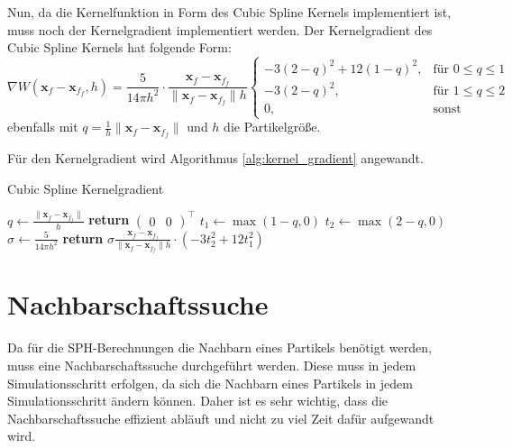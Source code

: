 \documentclass[11pt,
a4paper,
parskip=half, %
BCOR=10mm, %
english,
ngerman]{scrreprt}
\begin{document}
Nun, da die Kernelfunktion in Form des Cubic Spline Kernels implementiert ist, muss noch der Kernelgradient implementiert werden.
Der Kernelgradient des Cubic Spline Kernels hat folgende Form:
\begin{equation}
    \nabla W(\textbf{x}_f - \textbf{x}_{f_f}, h) = \frac{5}{14\pi h^2} \cdot \frac{\textbf{x}_f - \textbf{x}_{f_f}}{\|\textbf{x}_f - \textbf{x}_{f_f}\| h} \begin{cases}
        -3(2-q)^2 + 12(1-q)^2, &\text{für } 0 \leq q \leq 1\\
        -3(2-q)^2, &\text{für } 1 \leq q \leq 2\\
        0, &\text{sonst}
    \end{cases}
\end{equation}
ebenfalls mit $q = \frac{1}{h}\|\textbf{x}_f - \textbf{x}_{f_f}\|$ und $h$ die Partikelgröße.

Für den Kernelgradient wird Algorithmus \ref{alg:kernel_gradient} angewandt.
\begin{algorithm}
    \caption{Cubic Spline Kernelgradient}
    \label{alg:kernel_gradient}
    \begin{algorithmic}[1]
            \State $q \gets \frac{\|\textbf{x}_f - \textbf{x}_{f_f}\|}{h}$
                \State \textbf{return} $\begin{pmatrix}0 & 0 \end{pmatrix}^\intercal$
            \EndIf
            \State $t_1 \gets \max(1 - q, 0)$
            \State $t_2 \gets \max(2 - q, 0)$
            \State $\sigma \gets \frac{5}{14 \pi h^2}$
            \State \textbf{return} $\sigma \frac{\textbf{x}_f - \textbf{x}_{f_f}}{\|\textbf{x}_f - \textbf{x}_{f_f}\| h} \cdot (-3 t_2^2 + 12t_1^2)$
        \EndFunction
    \end{algorithmic}
\end{algorithm}


\section{Nachbarschaftssuche}
Da für die SPH-Berechnungen die Nachbarn eines Partikels benötigt werden, muss eine Nachbarschaftssuche durchgeführt werden.
Diese muss in jedem Simulationsschritt erfolgen, da sich die Nachbarn eines Partikels in jedem Simulationsschritt ändern können.
Daher ist es sehr wichtig, dass die Nachbarschaftssuche effizient abläuft und nicht zu viel Zeit dafür aufgewandt wird.
\end{document}
